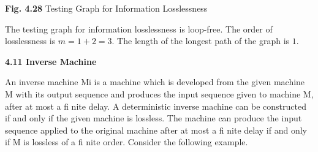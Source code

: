 \documentclass[a4,9pt]{beamer}
\begin{document}
\begin{frame}

\begin{center}
\end{center}

\centerline{\textbf{Fig. 4.28}\hspace*{0.1cm} Testing Graph for Information Losslessness}
\vspace*{0.1cm}

The testing graph for information losslessness is loop-free. The order of losslessness is $m = 1 + 2 = 3$. The length of the longest path of the graph is $1$.
\vspace*{0.1cm}

\LARGE{\textbf{4.11 \hspace*{0.1cm} Inverse Machine}}
\vspace*{0.1cm}

\small{An inverse machine Mi is a machine which is developed from the given machine M with its output sequence and produces the input sequence given to machine M, after at most a fi nite delay.
A deterministic inverse machine can be constructed if and only if the given machine is lossless. The machine can produce the input sequence applied to the original machine after at most a fi nite delay if and only if M is lossless of a fi nite order. Consider the following example.}
\end{frame}
\end{document}
